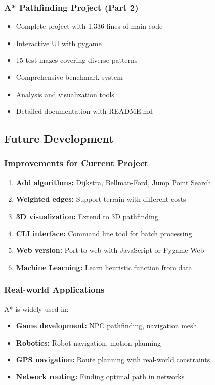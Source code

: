\documentclass[12pt,a4paper]{article}
\begin{document}
\subsubsection{A* Pathfinding Project (Part 2)}
\begin{itemize}
    \item Complete project with 1,336 lines of main code
    \item Interactive UI with pygame
    \item 15 test mazes covering diverse patterns
    \item Comprehensive benchmark system
    \item Analysis and visualization tools
    \item Detailed documentation with README.md
\end{itemize}

\subsection{Future Development}

\subsubsection{Improvements for Current Project}
\begin{enumerate}
    \item \textbf{Add algorithms:} Dijkstra, Bellman-Ford, Jump Point Search
    \item \textbf{Weighted edges:} Support terrain with different costs
    \item \textbf{3D visualization:} Extend to 3D pathfinding
    \item \textbf{CLI interface:} Command line tool for batch processing
    \item \textbf{Web version:} Port to web with JavaScript or Pygame Web
    \item \textbf{Machine Learning:} Learn heuristic function from data
\end{enumerate}

\subsubsection{Real-world Applications}
A* is widely used in:
\begin{itemize}
    \item \textbf{Game development:} NPC pathfinding, navigation mesh
    \item \textbf{Robotics:} Robot navigation, motion planning
    \item \textbf{GPS navigation:} Route planning with real-world constraints
    \item \textbf{Network routing:} Finding optimal path in networks
\end{itemize}
\end{document}
